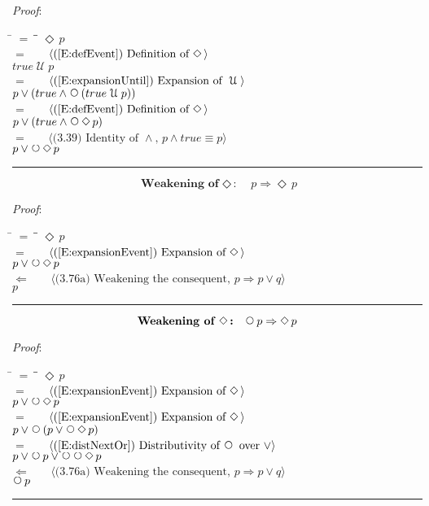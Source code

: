 \documentclass[12pt, fleqn, leqno]{article}
\newcommand{\lgap}{2pt}                             %
\newcommand{\mymathindent}{24pt}                    %
\newcommand{\impl}{\ensuremath{\Rightarrow}}        %
\newcommand{\foll}{\ensuremath{\Leftarrow}}         %
\newcommand{\Until}{\;\mathcal{U}\;}
\newcommand{\Next}{\;\,\text{\raisebox{3.5pt}{\circle{6}}}}
\newcommand{\Event}{\Diamond\,}
\newcommand{\myqed}{\rule[-.23ex]{1.2ex}{2.0ex}}
\newcommand{\myqedtab}{\hspace{384pt}}              %
\newcommand{\Gll} {\langle}                         %
\newcommand{\Ggg} {\rangle}                         %
\newcommand{\Hint}[1]     {\ \ \ $\Gll              \mbox{#1} \Ggg$ }   %
\begin{document}
\emph{Proof}:
\begin{tabbing}
\hspace{\mymathindent} \= $= \;$ \= \myqedtab \= \kill
  \> \>   $\Event p$\\[\lgap]
  \> $=$  \>  \Hint{(\ref{E:defEvent}) Definition of $\Event$}\\[\lgap]
  \> \>   $true \Until p$\\[\lgap]
  \> $=$  \>  \Hint{(\ref{E:expansionUntil}) Expansion of $\Until$}\\[\lgap]
  \> \>   $p \lor (true \land \Next(true \Until p))$\\[\lgap]
  \> $=$  \>  \Hint{(\ref{E:defEvent}) Definition of $\Event$}\\[\lgap]
  \> \>   $p \lor (true \land \Next\Event p)$\\[\lgap]
  \> $=$  \>  \Hint{(3.39) Identity of $\land$, $p\land true\equiv p$}\\[\lgap]
  \> \>   $p \lor \Next\Event p$ \quad \myqed
\end{tabbing}
\begin{equation}\label{E:impEvent}
\textbf{Weakening of $\Event$:}\quad p \impl \Event p
\end{equation}

\emph{Proof}:
\begin{tabbing}
\hspace{\mymathindent} \= $= \;$ \= \myqedtab \= \kill
  \> \>   $\Event p$\\[\lgap]
  \> $=$  \>  \Hint{(\ref{E:expansionEvent}) Expansion of $\Event$}\\[\lgap]
  \> \>   $p \lor \Next\Event p$\\[\lgap]
  \> $\foll$  \>  \Hint{(3.76a) Weakening the consequent, $p \impl p\lor q$}\\[\lgap]
  \> \>   $p$ \quad \myqed
\end{tabbing}
\begin{equation}\label{E:nextEvent}
\textbf{Weakening of $\Event$:}\quad \Next p \impl \Event p
\end{equation}

\emph{Proof}:
\begin{tabbing}
\hspace{\mymathindent} \= $= \;$ \= \myqedtab \= \kill
  \> \>   $\Event p$\\[\lgap]
  \> $=$  \>  \Hint{(\ref{E:expansionEvent}) Expansion of $\Event$}\\[\lgap]
  \> \>   $p \lor \Next\Event p$\\[\lgap]
  \> $=$  \>  \Hint{(\ref{E:expansionEvent}) Expansion of $\Event$}\\[\lgap]
  \> \>   $p \lor \Next (p \lor \Next\Event p)$\\[\lgap]
  \> $=$  \>  \Hint{(\ref{E:distNextOr}) Distributivity of $\Next$ over $\lor$}\\[\lgap]
  \> \>   $p \lor \Next p \lor \Next\Next\Event p$\\[\lgap]
  \> $\foll$  \>  \Hint{(3.76a) Weakening the consequent, $p \impl p\lor q$}\\[\lgap]
  \> \>   $\Next p$ \quad \myqed
\end{tabbing}
\end{document}
